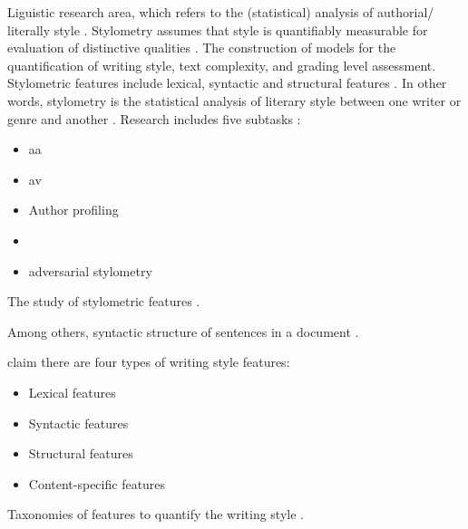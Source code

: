 \begin{definition}
    [Stylometry]
    Liguistic research area, which refers to the (statistical) analysis of authorial/ literally style \cite{elmanarelbouanani_authorship_2014,neal_surveying_2018}.
    Stylometry assumes that style is quantifiably measurable for evaluation of distinctive qualities \cite{neal_surveying_2018}.
    The construction of models for the quantification of writing style, text complexity, and grading level assessment.
    Stylometric features include lexical, syntactic and structural features \cite{stein_intrinsic_2011}.
    In other words, stylometry is the statistical analysis of literary style between one writer or genre and another \cite{tyo_state_2022}.
    Research includes five subtasks \cite{neal_surveying_2018}:
    \begin{itemize}
        \item \ac{aa}
        \item \ac{av}
        \item Author profiling
        \item {}
        \item adversarial stylometry
    \end{itemize}
\end{definition}

\begin{definition}
    [Stylistics]
    The study of stylometric features \cite{elmanarelbouanani_authorship_2014}.
\end{definition}

\begin{definition}
    Among others, syntactic structure of sentences in a document \cite{jafariakinabad_self_supervised_2022}.
\end{definition}

\citet{elmanarelbouanani_authorship_2014} claim there are four types of writing style features:
\begin{itemize}
    \item Lexical features
    \item Syntactic features
    \item Structural features
    \item Content-specific features 
\end{itemize}

\begin{definition}
    Taxonomies of features to quantify the writing style \cite{stamatatos_survey_2009}.
\end{definition}

